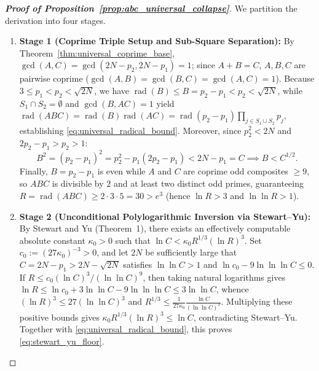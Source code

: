 \documentclass[11pt,a4paper]{article}
\theoremstyle{definition}
\begin{document}
\begin{proof}[\textbf{Proof of Proposition~\ref{prop:abc_universal_collapse}}]
We partition the derivation into four stages.
\begin{enumerate}
    \item \textbf{Stage 1 (Coprime Triple Setup and Sub-Square Separation):} By Theorem~\ref{thm:universal_coprime_base}, $\gcd(A, C) = \gcd(2N - p_2, 2N - p_1) = 1$; since $A + B = C$, $A, B, C$ are pairwise coprime ($\gcd(A, B) = \gcd(B, C) = \gcd(A, C) = 1$). Because $3 \le p_1 < p_2 < \sqrt{2N}$, we have $\operatorname{rad}(B) \le B = p_2 - p_1 < p_2 < \sqrt{2N}$, while $S_1 \cap S_2 = \emptyset$ and $\gcd(B, AC) = 1$ yield $\operatorname{rad}(ABC) = \operatorname{rad}(B)\operatorname{rad}(AC) = \operatorname{rad}(p_2 - p_1)\prod_{j \in S_1 \cup S_2} p_j$, establishing \eqref{eq:universal_radical_bound}. Moreover, since $p_2^2 < 2N$ and $2p_2 - p_1 > p_2 > 1$:
    \[
    B^2 = (p_2 - p_1)^2 = p_2^2 - p_1(2p_2 - p_1) < 2N - p_1 = C \implies B < C^{1/2}.
    \]
    Finally, $B = p_2 - p_1$ is even while $A$ and $C$ are coprime odd composites $\ge 9$, so $ABC$ is divisible by $2$ and at least two distinct odd primes, guaranteeing $R = \operatorname{rad}(ABC) \ge 2 \cdot 3 \cdot 5 = 30 > e^3$ (hence $\ln R > 3$ and $\ln\ln R > 1$).

    \item \textbf{Stage 2 (Unconditional Polylogarithmic Inversion via Stewart--Yu):} By Stewart and Yu \cite{stewartyu2001} (Theorem~1), there exists an effectively computable absolute constant $\kappa_0 > 0$ such that $\ln C < \kappa_0 R^{1/3} (\ln R)^3$. Set $c_0 := (27\kappa_0)^{-3} > 0$, and let $2N$ be sufficiently large that $C = 2N - p_1 > 2N - \sqrt{2N}$ satisfies $\ln\ln C > 1$ and $\ln c_0 - 9\ln\ln\ln C \le 0$. If $R \le c_0 (\ln C)^3 / (\ln\ln C)^9$, then taking natural logarithms gives $\ln R \le \ln c_0 + 3\ln\ln C - 9\ln\ln\ln C \le 3\ln\ln C$, whence $(\ln R)^3 \le 27(\ln\ln C)^3$ and $R^{1/3} \le \frac{1}{27\kappa_0} \frac{\ln C}{(\ln\ln C)^3}$. Multiplying these positive bounds gives $\kappa_0 R^{1/3}(\ln R)^3 \le \ln C$, contradicting Stewart--Yu. Together with \eqref{eq:universal_radical_bound}, this proves \eqref{eq:stewart_yu_floor}.


\end{enumerate}
\end{proof}
\end{document}
